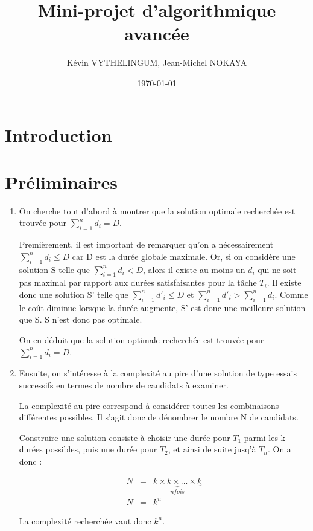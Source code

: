 \documentclass[a4paper, titlepage]{article}
\title{Mini-projet d'algorithmique avancée}      %
\author{Kévin VYTHELINGUM, Jean-Michel NOKAYA}           %
\date{\today}           %
\begin{document}
\maketitle
\tableofcontents
\newpage
\large

\section{Introduction}

\section{Préliminaires}

\begin{enumerate}
\item
	On cherche tout d'abord à montrer que la solution optimale recherchée est trouvée pour $\sum_{i=1}^{n} d_i = D$.

	Premièrement, il est important de remarquer qu'on a nécessairement $\sum_{i=1}^{n} d_i \le D$ car D est la durée globale maximale.
	Or, si on considère une solution S telle que $\sum_{i=1}^{n} d_i < D$, alors il existe au moins un $d_i$ qui ne soit pas maximal par rapport aux durées satisfaisantes pour la tâche $T_i$.
	Il existe donc une solution S' telle que $\sum_{i=1}^{n} d'_i \le D$ et $\sum_{i=1}^{n} d'_i > \sum_{i=1}^{n} d_i$.
	Comme le coût diminue lorsque la durée augmente, S' est donc une meilleure solution que S.
	S n'est donc pas optimale.

	On en déduit que la solution optimale recherchée est trouvée pour $\sum_{i=1}^{n} d_i = D$.

\item
	Ensuite, on s'intéresse à la complexité au pire d'une solution de type essais successifs en termes de nombre de candidats à examiner.

	La complexité au pire correspond à considérer toutes les combinaisons différentes possibles.
	Il s'agit donc de dénombrer le nombre N de candidats.

	Construire une solution consiste à choisir une durée pour $T_1$ parmi les k durées possibles, puis une durée pour $T_2$, et ainsi de suite jusq'à $T_n$.
	On a donc :

	\begin{eqnarray*}
		N & = & \underbrace{k \times k \times ... \times k}_{n fois} \\
		N & = & k^n
	\end{eqnarray*}

	La complexité recherchée vaut donc $k^{n}$.

\end{enumerate}
\end{document}

